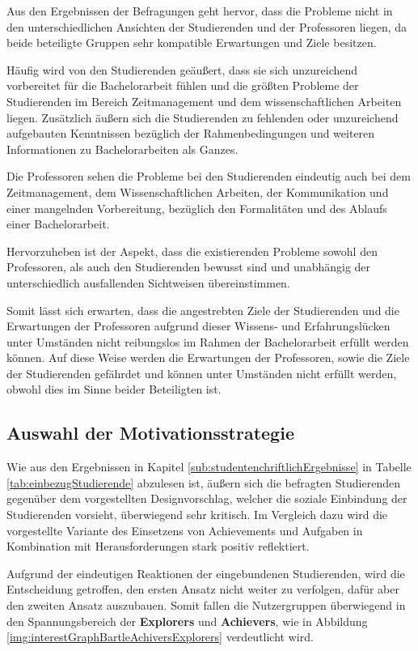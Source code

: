 \documentclass[bibliography=totoc,listof=totoc,BCOR=5mm,DIV=12,oneside]{scrbook}
\begin{document}
\par \bigskip Aus den Ergebnissen der Befragungen geht hervor, dass die Probleme nicht in den unterschiedlichen Ansichten der Studierenden und der Professoren liegen, da beide beteiligte Gruppen sehr kompatible Erwartungen und Ziele besitzen.

\par\medskip Häufig wird von den Studierenden geäußert, dass sie sich unzureichend vorbereitet für die Bachelorarbeit fühlen und die größten Probleme der Studierenden im Bereich Zeitmanagement und dem wissenschaftlichen Arbeiten liegen. Zusätzlich äußern sich die Studierenden zu fehlenden oder unzureichend aufgebauten Kenntnissen bezüglich der Rahmenbedingungen und weiteren Informationen zu Bachelorarbeiten als Ganzes.

\par\medskip Die Professoren sehen die Probleme bei den Studierenden eindeutig auch bei dem Zeitmanagement, dem Wissenschaftlichen Arbeiten, der Kommunikation und einer mangelnden Vorbereitung, bezüglich den Formalitäten und des Ablaufs einer Bachelorarbeit.

\par\medskip Hervorzuheben ist der Aspekt, dass die existierenden Probleme sowohl den Professoren, als auch den Studierenden bewusst sind und unabhängig der unterschiedlich ausfallenden Sichtweisen übereinstimmen.

\par\medskip Somit lässt sich erwarten, dass die angestrebten Ziele der Studierenden und die Erwartungen der Professoren aufgrund dieser Wissens- und Erfahrungslücken unter Umständen nicht reibungslos im Rahmen der Bachelorarbeit erfüllt werden können. Auf diese Weise werden die Erwartungen der Professoren, sowie die Ziele der Studierenden gefährdet und können unter Umständen nicht erfüllt werden, obwohl dies im Sinne beider Beteiligten ist.

\subsection{Auswahl der Motivationsstrategie}
\par Wie aus den Ergebnissen in Kapitel \ref{sub:studentenchriftlichErgebnisse} in Tabelle \ref{tab:einbezugStudierende} abzulesen ist, äußern sich die befragten Studierenden gegenüber dem vorgestellten Designvorschlag, welcher die soziale Einbindung der Studierenden vorsieht, überwiegend sehr kritisch. Im Vergleich dazu wird die vorgestellte Variante des Einsetzens von Achievements und Aufgaben in Kombination mit Herausforderungen stark positiv reflektiert.
\par Aufgrund der eindeutigen Reaktionen der eingebundenen Studierenden, wird die Entscheidung getroffen, den ersten Ansatz nicht weiter zu verfolgen, dafür aber den zweiten Ansatz auszubauen. Somit fallen die Nutzergruppen überwiegend in den Spannungsbereich der \textbf{Explorers} und \textbf{Achievers}, wie in Abbildung \ref{img:interestGraphBartleAchiversExplorers} verdeutlicht wird. 
\end{document}
